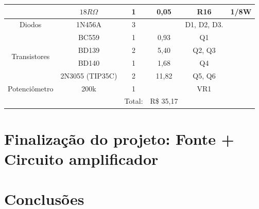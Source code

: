 \documentclass[a4paper,12pt,oneside,openany,table,xcdraw]{article}
\begin{document}
\begin{table}[H]
{\begin{tabular}{cc|c|c|cc}
\multicolumn{1}{|c|}{}                              & $18R \Omega$           & 1                   & 0,05           & \multicolumn{1}{c|}{R16}                & \multicolumn{1}{c|}{1/8W}                          \\ \hline
\multicolumn{1}{|c|}{Diodos}                        & 1N456A                 & 3                   &                & \multicolumn{1}{c|}{D1, D2, D3.}        & \multicolumn{1}{c|}{}                              \\ \hline
\multicolumn{1}{|c|}{\multirow{4}{*}{Transistores}} & BC559                  & 1                   & 0,93           & \multicolumn{1}{c|}{Q1}                 & \multicolumn{1}{c|}{}                              \\ \cline{2-6} 
\multicolumn{1}{|c|}{}                              & BD139                  & 2                   & 5,40           & \multicolumn{1}{c|}{Q2, Q3}             & \multicolumn{1}{c|}{}                              \\ \cline{2-6} 
\multicolumn{1}{|c|}{}                              & BD140                  & 1                   & 1,68           & \multicolumn{1}{c|}{Q4}                 & \multicolumn{1}{c|}{}                              \\ \cline{2-6} 
\multicolumn{1}{|c|}{}                              & 2N3055 (TIP35C)        & 2                   & 11,82           & \multicolumn{1}{c|}{Q5, Q6}             & \multicolumn{1}{c|}{}                              \\ \hline
\multicolumn{1}{|c|}{Potenciômetro}                 & 200k                   & 1                   &                & \multicolumn{1}{c|}{VR1}                & \multicolumn{1}{c|}{}                              \\ \hline
\multicolumn{1}{l}{}                                &                        & Total:              & R\$  35,17     &                                         &                                                    \\ \cline{3-4}
\end{tabular}%
}
\end{table}

\newpage
\section{Finalização do projeto: Fonte + Circuito amplificador}

\newpage
\section{Conclusões}
\end{document}
